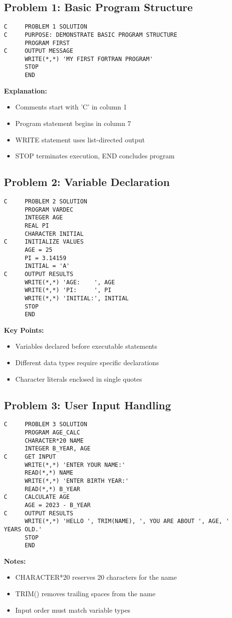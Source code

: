 \documentclass{book}
\begin{document}
\subsection*{Problem 1: Basic Program Structure}
\begin{verbatim}
C     PROBLEM 1 SOLUTION
C     PURPOSE: DEMONSTRATE BASIC PROGRAM STRUCTURE
      PROGRAM FIRST
C     OUTPUT MESSAGE
      WRITE(*,*) 'MY FIRST FORTRAN PROGRAM'
      STOP
      END
\end{verbatim}
\textbf{Explanation:}
\begin{itemize}
    \item Comments start with 'C' in column 1
    \item Program statement begins in column 7
    \item WRITE statement uses list-directed output
    \item STOP terminates execution, END concludes program
\end{itemize}

\subsection*{Problem 2: Variable Declaration}
\begin{verbatim}
C     PROBLEM 2 SOLUTION
      PROGRAM VARDEC
      INTEGER AGE
      REAL PI
      CHARACTER INITIAL
C     INITIALIZE VALUES
      AGE = 25
      PI = 3.14159
      INITIAL = 'A'
C     OUTPUT RESULTS
      WRITE(*,*) 'AGE:    ', AGE
      WRITE(*,*) 'PI:     ', PI
      WRITE(*,*) 'INITIAL:', INITIAL
      STOP
      END
\end{verbatim}
\textbf{Key Points:}
\begin{itemize}
    \item Variables declared before executable statements
    \item Different data types require specific declarations
    \item Character literals enclosed in single quotes
\end{itemize}

\subsection*{Problem 3: User Input Handling}
\begin{verbatim}
C     PROBLEM 3 SOLUTION
      PROGRAM AGE_CALC
      CHARACTER*20 NAME
      INTEGER B_YEAR, AGE
C     GET INPUT
      WRITE(*,*) 'ENTER YOUR NAME:'
      READ(*,*) NAME
      WRITE(*,*) 'ENTER BIRTH YEAR:'
      READ(*,*) B_YEAR
C     CALCULATE AGE
      AGE = 2023 - B_YEAR
C     OUTPUT RESULTS
      WRITE(*,*) 'HELLO ', TRIM(NAME), ', YOU ARE ABOUT ', AGE, ' YEARS OLD.'
      STOP
      END
\end{verbatim}
\textbf{Notes:}
\begin{itemize}
    \item CHARACTER*20 reserves 20 characters for the name
    \item TRIM() removes trailing spaces from the name
    \item Input order must match variable types
\end{itemize}
\end{document}
